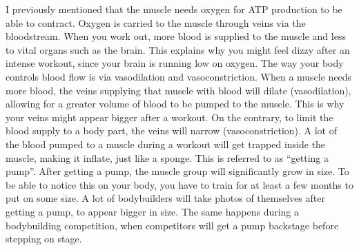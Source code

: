 \documentclass[openany, 12pt]{book}
\begin{document}
        I previously mentioned that the muscle needs oxygen for ATP production to be able to contract. Oxygen is carried to the muscle through veins via the bloodstream.
        When you work out, more blood is supplied to the muscle and less to vital organs such as the brain. This explains why you might feel dizzy after an intense workout,
        since your brain is running low on oxygen. The way your body controls blood flow is via vasodilation and vasoconstriction. When a muscle needs more blood,
        the veins supplying that muscle with blood will dilate (vasodilation), allowing for a greater volume of blood to be pumped to the muscle. This is why your veins might
        appear bigger after a workout. On the contrary, to limit the blood supply to a body part, the veins will narrow (vasoconstriction).
        A lot of the blood pumped to a muscle during a workout will get trapped inside the muscle, making it inflate, just like a sponge. This is referred to as ``getting a pump''.
        After getting a pump, the muscle group will significantly grow in size. To be able to notice this on your body, you have to train for at least a few months to put on some size.
        A lot of bodybuilders will take photos of themselves after getting a pump, to appear bigger in size. The same happens during a bodybuilding competition, when competitors will get a pump
        backstage before stepping on stage.
\end{document}
